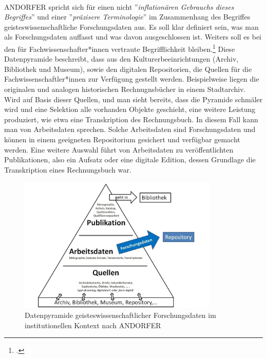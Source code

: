 \documentclass[12pt,a4paper]{article}
\begin{document}
\\
ANDORFER spricht sich für einen nicht ''\textit{inflationären Gebrauchs dieses Begriffes}'' und einer ''\textit{präzisere   Terminologie}'' im Zusammenhang des Begriffes geisteswissenschaftliche Forschungsdaten aus. Es soll klar definiert sein, was man als Forschungsdaten auffasst und was davon ausgeschlossen ist. Weiters soll es bei den für Fachwissenschafter*innen vertraute Begrifflichkeit bleiben.\footcite[][]{andorfer2015forschungsdaten}
Diese Datenpyramide beschreibt, dass aus den Kulturerbeeinrichtungen (Archiv, Bibliothek und Museum), sowie den digitalen Repositorien, die Quellen für die Fachwissenschaftler*innen zur Verfügung gestellt werden. Beispielweise liegen die originalen und analogen historischen Rechnugnsbücher in einem Stadtarchiv. Wird auf Basis dieser Quellen, und man sieht bereits, dass die Pyramide schmäler wird und eine Selektion alle vorhanden Objekte geschieht, eine weitere Leistung produziert, wie etwa eine Transkription des Rechnungsbuch. In diesem Fall kann man von Arbeitsdaten sprechen. Solche Arbeitsdaten sind Forschungsdaten und können in einem geeigneten Repositorium gesichert und verfügbar gemacht werden. Eine weitere Auswahl führt von Arbeitsdaten zu veröffentlichten Publikationen, also ein Aufsatz oder eine digitale Edition, dessen Grundlage die Transkription eines Rechnungsbuch war.
\begin{figure}[H]
\centering
	\includegraphics[width=0.85\textwidth]{img/forschungsdaten.png}  
    \caption[Datenpyramide geisteswissenschaftlicher Forschungsdaten im institutionellen Kontext, ANDORFER, Peter: Forschungsdaten in den (digitalen) Geisteswissenschaften: Versuch einer Konkretisierung, 2015, S.14]{Datenpyramide geisteswissenschaftlicher Forschungsdaten im institutionellen Kontext nach ANDORFER} \label{fig:forschungsdaten}
\end{figure} 
\end{document}
